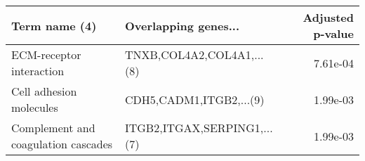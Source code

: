 \begin{tabular}{llr}
\toprule
                      Term name (4) &        Overlapping genes... &  Adjusted p-value \\
\midrule
           ECM-receptor interaction &   TNXB,COL4A2,COL4A1,...(8) &          7.61e-04 \\
            Cell adhesion molecules &     CDH5,CADM1,ITGB2,...(9) &          1.99e-03 \\
Complement and coagulation cascades & ITGB2,ITGAX,SERPING1,...(7) &          1.99e-03 \\
\bottomrule
\end{tabular}
